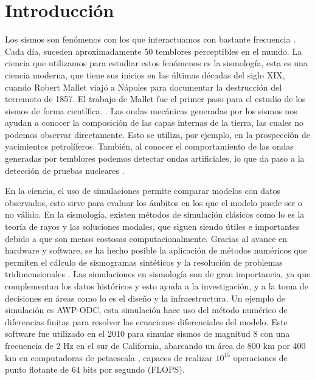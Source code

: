 \chapter{Introducción}
Los sismos son fenómenos con los que interactuamos con bastante frecuencia \cite{Shearer2019}. Cada día, suceden aproximadamente 50 temblores perceptibles en el mundo. La ciencia que utilizamos para estudiar estos fenómenos es la sismología, esta es una ciencia moderna, que tiene sus inicios en las últimas décadas del siglo XIX, cuando Robert Mallet viajó a Nápoles para documentar la destrucción del terremoto de 1857. El trabajo de Mallet fue el primer paso para el estudio de los sismos de forma científica. \cite{Shearer2019}. Las ondas mecánicas generadas por los sismos nos ayudan a conocer la composición de las capas internas de la tierra, las cuales no podemos observar directamente. Esto se utiliza, por ejemplo, en la prospección de yacimientos petrolíferos. También, al conocer el comportamiento de las ondas generadas por temblores podemos detectar ondas artificiales, lo que da paso a la detección de pruebas nucleares \cite{Shearer2019}.

En la ciencia, el uso de simulaciones permite comparar modelos con datos observados, esto sirve para evaluar los ámbitos en los que el modelo puede ser o no válido. En la sismología, existen métodos de simulación clásicos como lo es la teoría de rayos y las soluciones modales, que siguen siendo útiles e importantes debido a que son menos costosas computacionalmente. Gracias al avance en hardware y software, se ha hecho posible la aplicación de métodos numéricos que permiten el cálculo de sismogramas sintéticos y la resolución de problemas tridimensionales \cite{Igel2016}. Las simulaciones en sismología son de gran importancia, ya que complementan los datos históricos y esto ayuda a la investigación, y a la toma de decisiones en áreas como lo es el diseño y la infraestructura. Un ejemplo de simulación es AWP-ODC, esta simulación hace uso del método numérico de diferencias finitas para resolver las ecuaciones diferenciales del modelo. Este software fue utilizado en el 2010 para simular sismos de magnitud 8 con una frecuencia de 2 Hz en el sur de California, abarcando un área de 800 km por 400 km en computadoras de petaescala \cite{Cui2010}, capaces de realizar $10^{15}$ operaciones de punto flotante de 64 bits por segundo (FLOPS).

